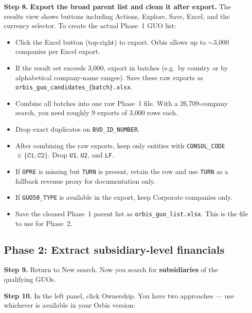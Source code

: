 \documentclass[11pt,a4paper]{article}
\newcommand{\field}[1]{\texttt{#1}}
\newcommand{\menu}[1]{\textsf{#1}}
\newcommand{\step}[1]{\noindent\textbf{Step #1.}\quad}
\begin{document}
\step{8} \textbf{Export the broad parent list and clean it after export.} The results view shows buttons including \menu{Actions}, \menu{Explore}, \menu{Save}, \menu{Excel}, and the currency selector. To create the actual Phase~1 GUO list:
\begin{itemize}[noitemsep]
  \item Click the \menu{Excel} button (top-right) to export. Orbis allows up to $\sim$3,000 companies per Excel export.
  \item If the result set exceeds 3,000, export in batches (e.g.\ by country or by alphabetical company-name ranges). Save these raw exports as \texttt{orbis\_guo\_candidates\_\{batch\}.xlsx}.
  \item Combine all batches into one raw Phase~1 file. With a 26,709-company search, you need roughly 9 exports of 3,000 rows each.
  \item Drop exact duplicates on \field{BVD\_ID\_NUMBER}.
  \item After combining the raw exports, keep only entities with \field{CONSOL\_CODE} $\in \{\field{C1}, \field{C2}\}$. Drop \field{U1}, \field{U2}, and \field{LF}.
  \item If \field{OPRE} is missing but \field{TURN} is present, retain the row and use \field{TURN} as a fallback revenue proxy for documentation only.
  \item If \field{GUO50\_TYPE} is available in the export, keep \menu{Corporate companies} only.
  \item Save the cleaned Phase~1 parent list as \texttt{orbis\_guo\_list.xlsx}. This is the file to use for Phase~2.
\end{itemize}

\subsection{Phase 2: Extract subsidiary-level financials}\label{sec:phase2}

\step{9} Return to \menu{New search}. Now you search for \textbf{subsidiaries} of the qualifying GUOs.

\step{10} In the left panel, click \menu{Ownership}. You have two approaches --- use whichever is available in your Orbis version:
\end{document}
